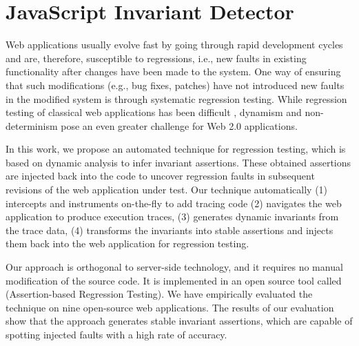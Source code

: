 \chapter{JavaScript Invariant Detector}
\label{Sec:jsartIntro}
Web applications usually evolve fast by going through rapid development cycles and are, therefore, susceptible to regressions, i.e., new faults in existing functionality after changes have been made to the system. One way of ensuring that such modifications (e.g., bug fixes, patches) have not introduced new faults in the modified system is through systematic regression testing.
While regression testing of classical web applications
has been difficult \cite{tarhini:reg08}, dynamism and non-determinism pose an even greater challenge \cite{Roest:2010.icst} for Web 2.0 applications.

In this work, we propose an automated technique for \javascript regression testing, which is based on dynamic analysis to infer invariant assertions. These obtained assertions are injected back into the \javascript code to uncover regression faults in subsequent revisions of the web application under test. 
Our technique automatically (1) intercepts and instruments \javascript on-the-fly to add tracing code (2) navigates the web application to produce execution traces, (3) generates dynamic invariants from the trace data, (4) transforms the invariants into stable assertions and injects them back into the web application for regression testing.

Our approach is orthogonal to server-side technology, and it requires no manual modification of the source code. It is implemented in an open source tool called \jsart (\javascript Assertion-based Regression Testing).  We have empirically
evaluated the technique on nine open-source web applications. The results of our evaluation show that the approach generates stable invariant assertions, which are capable of spotting injected faults with a high rate of accuracy.





%
%